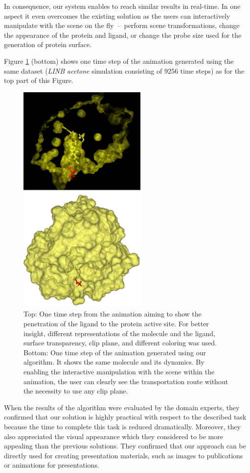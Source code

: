 In consequence, our system enables to reach similar results in real-time. 
In one aspect it even overcomes the existing solution as the users can interactively manipulate with the scene on the fly~--~perform scene transformations, change the appearance of the protein and ligand, or change the probe size used for the generation of protein surface.

Figure \ref{fig:animation} (bottom) shows one time step of the animation generated using the same dataset (\textit{LINB acetone} simulation consisting of 9256 time steps) as for the top part of this Figure.

\begin{figure}[htb]
  \centering
  \includegraphics[width=2.5in]{image/animation.png}
  \caption{Top: One time step from the animation aiming to show the penetration of the ligand to the protein active site. For better insight, different representations of the molecule and the ligand, surface transparency, clip plane, and different coloring was used. Bottom: One time step of the animation generated using our algorithm. It shows the same molecule and its dynamics. By enabling the interactive manipulation with the scene within the animation, the user can clearly see the transportation route without the necessity to use any clip plane.}
	\label{fig:animation}
\end{figure}

When the results of the algorithm were evaluated by the domain experts, they confirmed that our solution is highly practical with respect to the described task because the time to complete this task is reduced dramatically.
Moreover, they also appreciated the visual appearance which they considered to be more appealing than the previous solutions.
They confirmed that our approach can be directly used for creating presentation materials, such as images to publications or animations for presentations.

